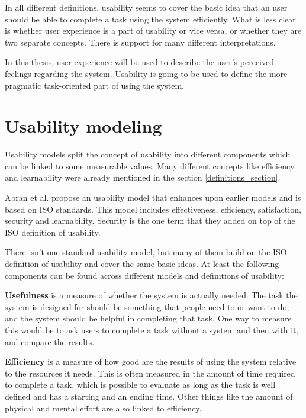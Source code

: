 In all different definitions, usability seems to cover the basic idea that an user should be able to complete a task using the system efficiently. What is less clear is whether user experience is a part of usability or vice versa, or whether they are two separate concepts. There is support for many different interpretations.

In this thesis, user experience will be used to describe the user's perceived feelings regarding the system. Usability is going to be used to define the more pragmatic task-oriented part of using the system.


\section{Usability modeling}\label{usability_attributes}
Usability models split the concept of usability into different components which can be linked to some measurable values. Many different concepts like efficiency and learnability were already mentioned in the section \ref{definitions_section}.

Abran et al. \cite{abran2003usability} propose an usability model that enhances upon earlier models and is based on ISO standards. This model includes effectiveness, efficiency, satisfaction, security and learnability. Security is the one term that they added on top of the ISO definition of usability.

There isn't one standard usability model, but many of them build on the ISO definition of usability and cover the same basic ideas. At least the following components can be found across different models and definitions of usability:

\textbf{Usefulness} is a measure of whether the system is actually needed. The task the system is designed for should be something that people need to or want to do, and the system should be helpful in completing that task. One way to measure this would be to ask users to complete a task without a system and then with it, and compare the results. \cite{albert2013measuring, rubin2008handbook}

\textbf{Efficiency} is a measure of how good are the results of using the system relative to the resources it needs. This is often measured in the amount of time required to complete a task, which is possible to evaluate as long as the task is well defined and has a starting and an ending time. Other things like the amount of physical and mental effort are also linked to efficiency. \cite{albert2013measuring, rubin2008handbook}


